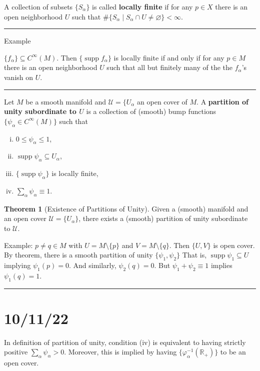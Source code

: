 \documentclass[12pt]{article}
\newcommand{\keyword}[1]{\textbf{#1}}
\newcommand{\sepline}{\rule{\textwidth}{0.4pt}}
\theoremstyle{definition}
\newtheorem{theorem}{Theorem}
\newcommand{\R}{\mathbb{R}}
\newcommand{\UU}{\mathcal{U}}
\renewcommand{\phi}{\varphi}
\renewcommand{\emptyset}{\varnothing}
\newcommand{\<}{\left\langle}
\renewcommand{\>}{\right\rangle}
\newcommand{\seq}{\subseteq}
\DeclareMathOperator{\supp}{supp}
\begin{document}
A collection of subsets $\{S_\alpha\}$ is called \keyword{locally finite} if for any $p \in X$ there is an open neighborhood $U$ such that $\#\{S_\alpha \mid S_\alpha \cap U \ne \emptyset\} < \infty$.

\sepline

Example

$\{f_\alpha\} \seq C^\infty(M)$.
Then $\{\supp f_\alpha\}$ is locally finite if and only if for any $p \in M$ there is an open neighborhood $U$ such that all but finitely many of the the $f_\alpha$'s vanish on $U$.

\sepline

Let $M$ be a smooth manifold and $\UU = \{U_\alpha$ an open cover of $M$.
A \keyword{partition of unity subordinate to $U$} is a collection of (smooth) bump functions $\{\psi_\alpha \in C^\infty(M)\}$ such that
\begin{enumerate}[(i)]
    \item $0 \leq \psi_\alpha \leq 1$,
    \item $\supp \psi_\alpha \seq U_\alpha$,
    \item $\{\supp \psi_\alpha\}$ is locally finite,
    \item $\sum_\alpha \psi_\alpha \equiv 1$.
\end{enumerate}


\begin{theorem}[Existence of Partitions of Unity]
    Given a (smooth) manifold and an open cover $\UU = \{U_\alpha\}$, there exists a (smooth) partition of unity subordinate to $\UU$.
\end{theorem}

Example: $p \ne q \in M$ with $U = M \setminus \{p\}$ and $V = M \setminus \{q\}$.
Then $\{U, V\}$ is open cover.
By theorem, there is a smooth partition of unity $\{\psi_1, \psi_2\}$
That is, $\supp \psi_1 \seq U$ implying $\psi_1(p) = 0$.
And similarly, $\psi_2(q) = 0$.
But $\psi_1 + \psi_2 \equiv 1$ implies $\psi_1(q) = 1$.

\sepline

\section*{10/11/22}

In definition of partition of unity, condition (iv) is equivalent to having strictly positive $\sum_\alpha \psi_\alpha > 0$.
Moreover, this is implied by having $\{\phi_\alpha^{-1}(\R_+)\}$ to be an open cover.
\end{document}
